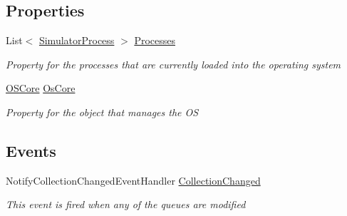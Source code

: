 \subsection*{Properties}
\begin{DoxyCompactItemize}
\item 
List$<$ \hyperlink{class_c_p_u___o_s___simulator_1_1_operating___system_1_1_simulator_process}{Simulator\+Process} $>$ \hyperlink{class_c_p_u___o_s___simulator_1_1_operating_system_main_window_aadbbb1f580d767211e180a95ec71b849}{Processes}
\begin{DoxyCompactList}\small\item\em Property for the processes that are currently loaded into the operating system \end{DoxyCompactList}\item 
\hyperlink{class_c_p_u___o_s___simulator_1_1_operating___system_1_1_o_s_core}{O\+S\+Core} \hyperlink{class_c_p_u___o_s___simulator_1_1_operating_system_main_window_ad714e0ed6e880516f8afc3f1531a2d14}{Os\+Core}
\begin{DoxyCompactList}\small\item\em Property for the object that manages the O\+S \end{DoxyCompactList}\end{DoxyCompactItemize}
\subsection*{Events}
\begin{DoxyCompactItemize}
\item 
Notify\+Collection\+Changed\+Event\+Handler \hyperlink{class_c_p_u___o_s___simulator_1_1_operating_system_main_window_af8aeaf0c83021caf8f735ea7c051848c}{Collection\+Changed}
\begin{DoxyCompactList}\small\item\em This event is fired when any of the queues are modified \end{DoxyCompactList}\end{DoxyCompactItemize}
